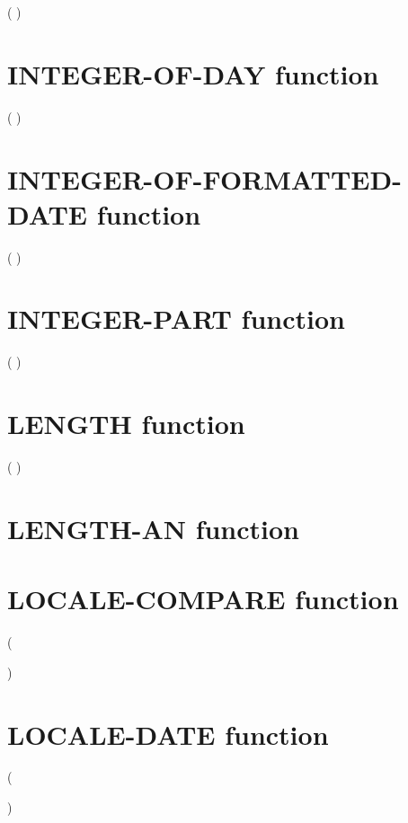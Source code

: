   ( \argument )

\section{INTEGER-OF-DAY function}

  ( \argument )

\section{INTEGER-OF-FORMATTED-DATE function}

  ( \argument \argument )

\section{INTEGER-PART function}

  ( \argument )

\section{LENGTH function}

  ( \argument )

\section{LENGTH-AN function}


\section{LOCALE-COMPARE function}

  ( \argument \argument
\begin{0-1}
  \argument
\end{0-1}
)

\section{LOCALE-DATE function}

  ( \argument
\begin{0-1}
  \argument
\end{0-1}
)

